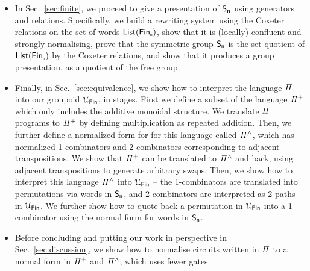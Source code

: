\begin{itemize}[leftmargin=*]
      \item In Sec.~\ref{sec:finite}, we proceed to give a presentation of $\Sn$ using generators and relations.
            Specifically, we build a rewriting system using the Coxeter relations on the set of words $\List[\Fin[n]]$, show
            that it is (locally) confluent and strongly normalising, prove that the symmetric group $\Sn$ is the
            set-quotient of $\List[\Fin[n]]$ by the Coxeter relations, and show that it produces a group presentation, as a
            quotient of the free group.
      \item Finally, in Sec.~\ref{sec:equivalence}, we show how to interpret the language $\mathit{\Pi}$ into our groupoid
            $\UFin$, in stages. First we define a subset of the language $\mathit{{\Pi}^{+}}$ which only includes the additive
            monoidal structure. We translate $\mathit{\Pi}$ programs to $\mathit{{\Pi}^{+}}$ by defining multiplication as repeated
            addition. Then, we further define a normalized form for for this language called $\mathit{{\Pi}^{\wedge}}$, which has
            normalized 1-combinators and 2-combinators corresponding to adjacent transpositions. We show that $\mathit{{\Pi}^{+}}$
            can be translated to $\mathit{{\Pi}^{\wedge}}$ and back, using adjacent transpositions to generate arbitrary swaps. Then, we
            show how to interpret this language $\mathit{{\Pi}^{\wedge}}$ into $\UFin$ -- the 1-combinators are translated into
            permutations via words in $\Sn$, and 2-combinators are interpreted as 2-paths in $\UFin$. We further show how to
            quote back a permutation in $\UFin$ into a 1-combinator using the normal form for words in $\Sn$.
      \item Before concluding and putting our work in perspective in Sec.~\ref{sec:discussion}, we show how to normalise
            circuits written in $\mathit{\Pi}$ to a normal form in $\mathit{{\Pi}^{+}}$ and $\mathit{{\Pi}^{\wedge}}$, which uses fewer gates.
\end{itemize}

